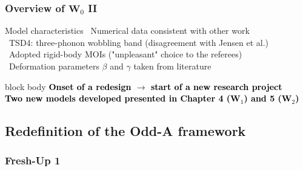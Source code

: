 \documentclass{beamer}
\begin{document}
\begin{frame}
	\frametitle{Overview of $\mathbf{W}_0$ II}
	\begin{block}{Model characteristics}
		\faPlus\ Numerical data consistent with other work\\
		\faMinus\ TSD4: three-phonon wobbling band (disagreement with Jensen et al.)\\
		\faMinus\ Adopted rigid-body MOIs ("unpleasant" choice to the referees) \\
		\faMinus\ Deformation parameters $\beta$ and $\gamma$ taken from literature
	\end{block}
	\vspace{0.4cm}
	\begin{beamercolorbox}[rounded=true,shadow=false, wd=\linewidth,]{block body}
		\centering
		\textcolor{black}{\small{\textbf{Onset of a redesign $\longrightarrow$ start of a new research project}}}\\
		\textcolor{black}{\small{\textbf{Two new models developed presented in Chapter 4 ($\mathbf{W}_1$) and 5 ($\mathbf{W}_2$)}}}\\
	\end{beamercolorbox}
\end{frame}
\subsection{Redefinition of the Odd-A framework}

\subsubsection{Fresh-Up 1}
\end{document}
